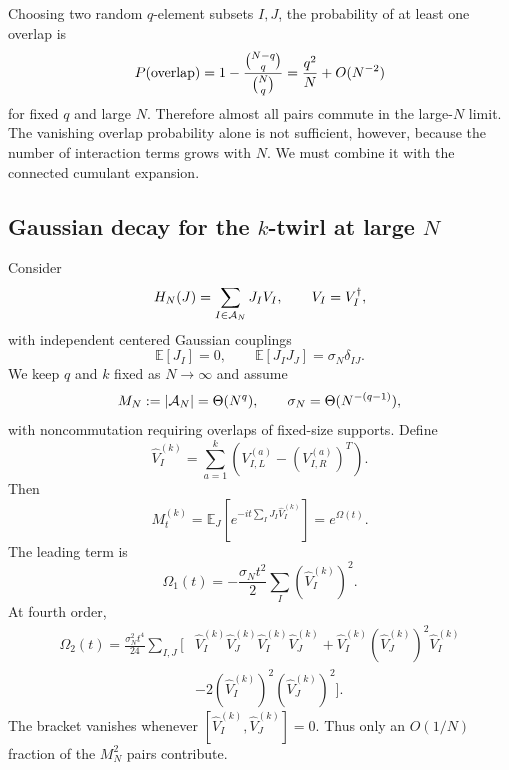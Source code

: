 \documentclass{article}
\theoremstyle{definition}
\begin{document}
Choosing two random $q$-element subsets $I,J$, the probability of at least
one overlap is
\begin{equation}
    P({\rm overlap})
    =1-\frac{\binom{N-q}{q}}{\binom Nq}
    =\frac{q^2}{N}+O(N^{-2})
\end{equation}
for fixed $q$ and large $N$.  Therefore almost all pairs commute in the
large-$N$ limit.  The vanishing overlap probability alone is not sufficient,
however, because the number of interaction terms grows with $N$.  We must
combine it with the connected cumulant expansion.


\subsection{Gaussian decay for the $k$-twirl at large $N$}
\label{subsec:quenched_syk_gaussian_regulator}

Consider
\begin{equation}
    H_N(J)=\sum_{I\in{\cal A}_N}J_IV_I,
    \qquad
    V_I=V_I^\dagger,
\end{equation}
with independent centered Gaussian couplings
\begin{equation}
    \mathbb E[J_I]=0,
    \qquad
    \mathbb E[J_IJ_J]=\sigma_N\delta_{IJ}.
\end{equation}
We keep $q$ and $k$ fixed as $N\to\infty$ and assume
\begin{equation}
    M_N:=|{\cal A}_N|=\Theta(N^q),
    \qquad
    \sigma_N=\Theta(N^{-(q-1)}),
\end{equation}
with noncommutation requiring overlaps of fixed-size supports.  Define
\begin{equation}
    \widehat V_I^{(k)}
    =\sum_{a=1}^k
    \left(V_{I,L}^{(a)}-(V_{I,R}^{(a)})^T\right).
\end{equation}
Then
\begin{equation}
    M_t^{(k)}
    =\mathbb E_J\!\left[
       e^{-it\sum_IJ_I\widehat V_I^{(k)}}
    \right]
    =e^{\Omega(t)}.
\end{equation}
The leading term is
\begin{equation}
    \Omega_1(t)
    =-\frac{\sigma_Nt^2}{2}
    \sum_I(\widehat V_I^{(k)})^2.
\end{equation}
At fourth order,
\begin{align}
    \Omega_2(t)
    =\frac{\sigma_N^2t^4}{24}
    \sum_{I,J}
    \bigg[&
       \widehat V_I^{(k)}\widehat V_J^{(k)}
       \widehat V_I^{(k)}\widehat V_J^{(k)}
       +\widehat V_I^{(k)}(\widehat V_J^{(k)})^2
        \widehat V_I^{(k)}
       \nonumber\\
       &-2(\widehat V_I^{(k)})^2(\widehat V_J^{(k)})^2
    \bigg].
\end{align}
The bracket vanishes whenever
$[\widehat V_I^{(k)},\widehat V_J^{(k)}]=0$.  Thus only an $O(1/N)$
fraction of the $M_N^2$ pairs contribute.
\end{document}
